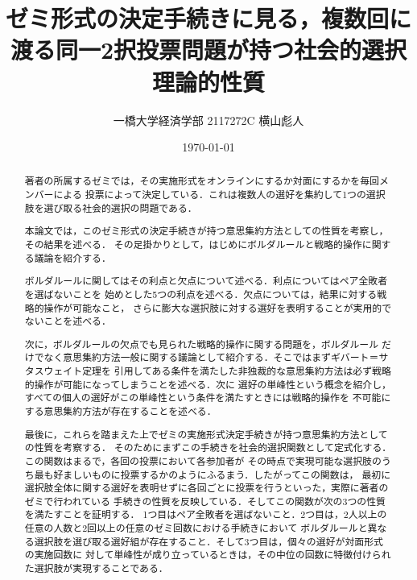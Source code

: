 \documentclass[dvipdfmx]{jsarticle}
\begin{document}
\title{ゼミ形式の決定手続きに見る，複数回に渡る同一2択投票問題が持つ社会的選択理論的性質}
\author{一橋大学経済学部 2117272C 横山彪人}
\date{\today}
\maketitle

\begin{abstract}
  著者の所属するゼミでは，その実施形式をオンラインにするか対面にするかを毎回メンバーによる
  投票によって決定している．これは複数人の選好を集約して1つの選択肢を選び取る社会的選択の問題である．
  
  本論文では，このゼミ形式の決定手続きが持つ意思集約方法としての性質を考察し，その結果を述べる．
  その足掛かりとして，はじめにボルダルールと戦略的操作に関する議論を紹介する．
  
  ボルダルールに関してはその利点と欠点について述べる．利点についてはペア全敗者を選ばないことを
  始めとした5つの利点を述べる．欠点については，結果に対する戦略的操作が可能なこと，
  さらに膨大な選択肢に対する選好を表明することが実用的でないことを述べる．
  
  次に，ボルダルールの欠点でも見られた戦略的操作に関する問題を，ボルダルール
  だけでなく意思集約方法一般に関する議論として紹介する．そこではまずギバート＝サタスウェイト定理を
  引用してある条件を満たした非独裁的な意思集約方法は必ず戦略的操作が可能になってしまうことを述べる．次に
  選好の単峰性という概念を紹介し，すべての個人の選好がこの単峰性という条件を満たすときには戦略的操作を
  不可能にする意思集約方法が存在することを述べる．
  
  最後に，これらを踏まえた上でゼミの実施形式決定手続きが持つ意思集約方法としての性質を考察する．
  そのためにまずこの手続きを社会的選択関数として定式化する．この関数はまるで，各回の投票において各参加者が
  その時点で実現可能な選択肢のうち最も好ましいものに投票するかのようにふるまう．したがってこの関数は，
  最初に選択肢全体に関する選好を表明せずに各回ごとに投票を行うといった，実際に著者のゼミで行われている
  手続きの性質を反映している．そしてこの関数が次の3つの性質を満たすことを証明する．
  1つ目はペア全敗者を選ばないこと．2つ目は，2人以上の任意の人数と2回以上の任意のゼミ回数における手続きにおいて
  ボルダルールと異なる選択肢を選び取る選好組が存在すること．そして3つ目は，個々の選好が対面形式の実施回数に
  対して単峰性が成り立っているときは，その中位の回数に特徴付けられた選択肢が実現することである．
\end{abstract}

\tableofcontents
\clearpage
\end{document}
